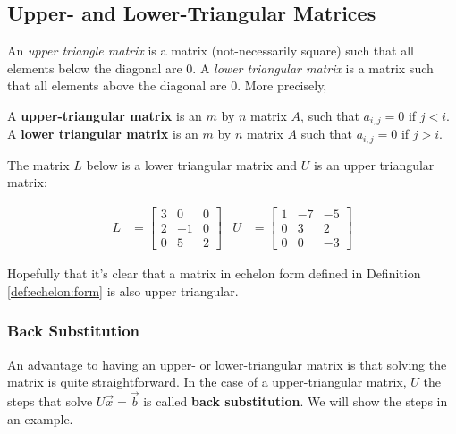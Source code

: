 \subsection{Upper- and Lower-Triangular Matrices}

An \emph{upper triangle matrix} is a matrix (not-necessarily square) such that all elements below the diagonal are 0.  A \emph{lower triangular matrix} is a matrix such that all elements above the diagonal are 0.  More precisely,

\begin{definition}
A \textbf{upper-triangular matrix} is an $m$ by $n$ matrix $A$, such that $a_{i,j}=0$ if $j<i$.  A \textbf{lower triangular matrix} is an $m$ by $n$ matrix $A$ such that $a_{i,j}=0$ if $j>i$.  
\end{definition}

\begin{example}
The matrix $L$ below is a lower triangular matrix and $U$ is an upper triangular matrix:

\begin{align*}
L & = \begin{bmatrix}
3 & 0 & 0 \\
2 & -1 & 0 \\
0 & 5 & 2
\end{bmatrix} & 
U & = \begin{bmatrix}
1 & -7 & -5 \\
0 & 3 & 2 \\
0 & 0 & -3 
\end{bmatrix}
\end{align*}
\end{example}

Hopefully that it's clear that a matrix in echelon form defined in Definition \ref{def:echelon:form} is also upper triangular.  


\subsubsection{Back Substitution}

An advantage to having an upper- or lower-triangular matrix is that solving the matrix is quite straightforward.  In the case of a upper-triangular matrix, $U$ the steps that solve $U\vec{x}=\vec{b}$ is called \textbf{back substitution}.   We will show the steps in an example. 

